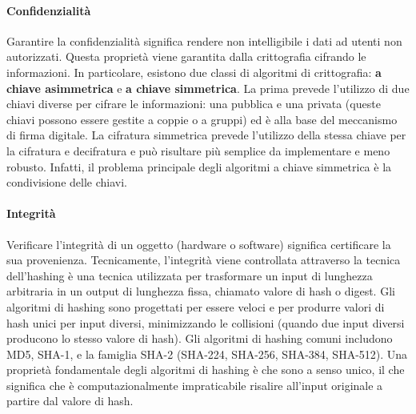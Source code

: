 \documentclass{article}
\begin{document}
\paragraph{Confidenzialità} Garantire la confidenzialità significa rendere non intelligibile i dati ad utenti non autorizzati. Questa proprietà viene garantita dalla crittografia cifrando le informazioni. In particolare, esistono due classi di algoritmi di crittografia: \textbf{a chiave asimmetrica} e \textbf{a chiave simmetrica}. La prima prevede l'utilizzo di due chiavi diverse per cifrare le informazioni: una pubblica e una privata (queste chiavi possono essere gestite a coppie o a gruppi) ed è alla base del meccanismo di firma digitale. La cifratura simmetrica prevede l'utilizzo della stessa chiave per la cifratura e decifratura e può risultare più semplice da implementare e meno robusto. Infatti, il problema principale degli algoritmi a chiave simmetrica è la condivisione delle chiavi. 

\paragraph{Integrità} Verificare l'integrità di un oggetto (hardware o software) significa certificare la sua provenienza. Tecnicamente, l'integrità viene controllata attraverso la tecnica dell'hashing è una tecnica utilizzata per trasformare un input di lunghezza arbitraria in un output di lunghezza fissa, chiamato valore di hash o digest. Gli algoritmi di hashing sono progettati per essere veloci e per produrre valori di hash unici per input diversi, minimizzando le collisioni (quando due input diversi producono lo stesso valore di hash). Gli algoritmi di hashing comuni includono MD5, SHA-1, e la famiglia SHA-2 (SHA-224, SHA-256, SHA-384, SHA-512). Una proprietà fondamentale degli algoritmi di hashing è che sono a senso unico, il che significa che è computazionalmente impraticabile risalire all'input originale a partire dal valore di hash.
\end{document}
